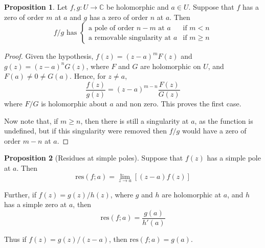 \documentclass[10pt,fleqn]{article}
\newcommand{\comps}{\mathbb{C}}
\newcommand{\res}{\mathrm{res}}
\theoremstyle{definition} \newtheorem{defn}{Definition}[section]
\theoremstyle{plain}      \newtheorem{thm}[defn]{Theorem}
\theoremstyle{definition} \newtheorem{prop}[defn]{Proposition}
\theoremstyle{plain}      \newtheorem{lem}[defn]{Lemma}
\theoremstyle{definition} \newtheorem{cor}[defn]{Corollary}
\theoremstyle{definition} \newtheorem{ex}[defn]{Example}
\theoremstyle{definition} \newtheorem{rem}[defn]{Remark}
\begin{document}
\begin{prop}
    Let $f,g:U\to\comps$ be holomorphic and $a\in U$.
    Suppose that $f$ has a zero of order $m$ at $a$ and $g$ has a zero of order $n$ at $a$.
    Then
    \[
        f/g\text{ has }
        \left\{
        \begin{array}{lr}
            \text{a pole of order }n-m\text{ at }a & \text{if }m<n\\
            \text{a removable singularity at }a & \text{if }m\geq n
        \end{array}
        \right.
    \]
\end{prop}

\begin{proof}
    Given the hypothesis, $f(z)=(z-a)^mF(z)$ and $g(z)=(z-a)^nG(z)$, where $F$ and $G$ are holomorphic on $U$, and $F(a)\neq0\neq G(a)$.
    Hence, for $z\neq a$,
    \[
        \frac{f(z)}{g(z)}=
        (z-a)^{m-n}\frac{F(z)}{G(z)}
    \]
    where $F/G$ is holomorphic about $a$ and non zero.
    This proves the first case.

    Now note that, if $m\geq n$, then there is still a singularity at $a$, as the function is undefined, but if this singularity were removed then $f/g$ would have a zero of order $m-n$ at $a$.
\end{proof}

\begin{prop}[Residues at simple poles]
    Suppose that $f(z)$ has a simple pole at $a$.
    Then
    \begin{equation}
        \res(f;a)=
        \lim_{z\to a}[(z-a)f(z)]
    \end{equation}

    Further, if $f(z)=g(z)/h(z)$, where $g$ and $h$ are holomorphic at $a$, and $h$ has a simple zero at $a$, then
    \begin{equation}
        \res(f;a)=
        \frac{g(a)}{h'(a)}
    \end{equation}

    Thus if $f(z)=g(z)/(z-a)$, then $\res(f;a)=g(a)$.

\end{prop}
\end{document}

